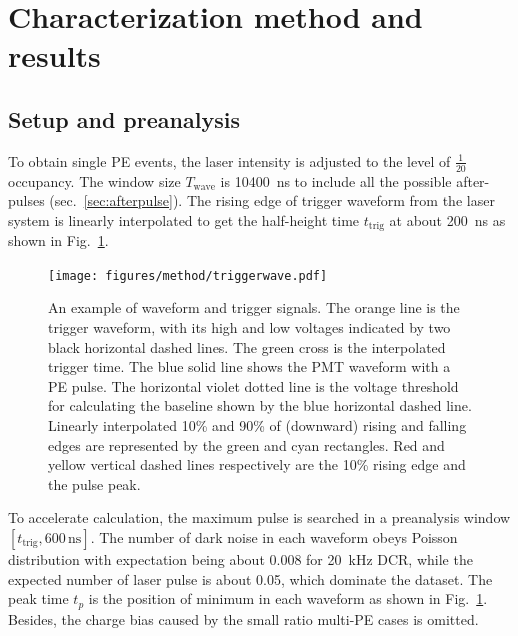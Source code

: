 \section{Characterization method and results}
\label{Method}
\subsection{Setup and preanalysis}
\label{sec:laserstage}

To obtain single PE events, the laser intensity is adjusted to the level of $\frac{1}{20}$ occupancy. The window size $T_{\mathrm{wave}}$ is \SI{10400}{ns} to include all the possible after-pulses (sec.~\ref{sec:afterpulse}). The rising edge of trigger waveform from the laser system is linearly interpolated to get the half-height time $t_{\mathrm{trig}}$ at about \SI{200}{ns} as shown in Fig.~\ref{fig:triggertime}.
\begin{figure}[!htbp]
    \centering
    \texttt{[image: figures/method/triggerwave.pdf]}
    \caption{An example of waveform and trigger signals. The orange line is the trigger waveform, with its high and low voltages indicated by two black horizontal dashed lines. The green cross is the interpolated trigger time. The blue solid line shows the PMT waveform with a PE pulse. The horizontal violet dotted line is the voltage threshold for calculating the baseline shown by the blue horizontal dashed line. Linearly interpolated 10\% and 90\% of (downward) rising and falling edges are represented by the green and cyan rectangles. Red and yellow vertical dashed lines respectively are the 10\% rising edge and the pulse peak.}
    \label{fig:triggertime}
\end{figure}

To accelerate calculation, the maximum pulse is searched in a preanalysis window $[t_{\mathrm{trig}},600\,\mathrm{ns}]$. The number of dark noise in each waveform obeys Poisson distribution with expectation being about 0.008 for \SI{20}{kHz} DCR, while the expected number of laser pulse is about 0.05, which dominate the dataset. The peak time $t_p$ is the position of minimum in each waveform as shown in Fig.~\ref{fig:triggertime}.
Besides, the charge bias caused by the small ratio multi-PE cases is omitted.

